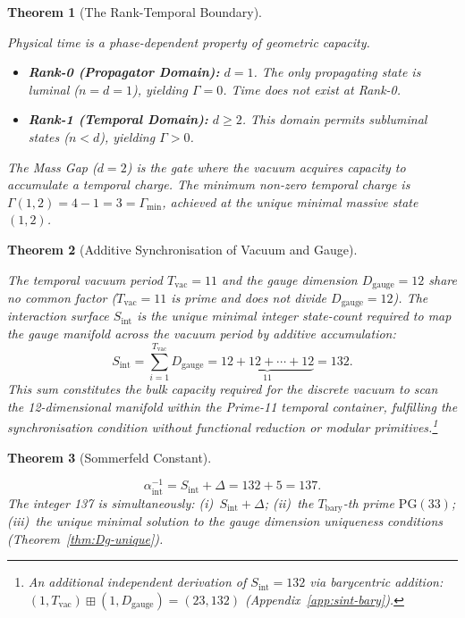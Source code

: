 \documentclass[11pt, letterpaper]{article}
\newcommand{\bplus}{\boxplus}
\newcommand{\Tcharge}{\Gamma}
\newcommand{\Dg}{D_{\mathrm{gauge}}}
\newcommand{\Sint}{S_{\mathrm{int}}}
\newcommand{\PG}{\mathrm{PG}}
\theoremstyle{definition}
\theoremstyle{plain}
\newtheorem{theorem}{Theorem}[section]
\begin{document}
\begin{theorem}[The Rank-Temporal Boundary]\label{thm:rank-temporal}
\begin{rsbox}
Physical time is a phase-dependent property of geometric capacity.
\begin{itemize}[nosep]
\item \textbf{Rank-0 (Propagator Domain):} $d=1$.  The only propagating state
  is luminal ($n=d=1$), yielding $\Tcharge=0$.  Time does not exist at Rank-0.
\item \textbf{Rank-1 (Temporal Domain):} $d\geq 2$.  This domain permits
  subluminal states ($n<d$), yielding $\Tcharge>0$.
\end{itemize}
The Mass Gap ($d=2$) is the gate where the vacuum acquires capacity
to accumulate a temporal charge.  The minimum non-zero temporal charge is
$\Tcharge(1,2)=4-1=3=\Gamma_{\min}$, achieved at the unique minimal massive
state $(1,2)$.
\end{rsbox}
\end{theorem}

\begin{theorem}[Additive Synchronisation of Vacuum and Gauge]
\label{thm:sint-additive}
\begin{rsbox}
The temporal vacuum period $T_{\mathrm{vac}}=11$ and the gauge dimension
$\Dg=12$ share no common factor ($T_{\mathrm{vac}}=11$ is prime and does not divide $\Dg=12$).  The interaction
surface $\Sint$ is the unique minimal integer state-count required to map the
gauge manifold across the vacuum period by additive accumulation:
\begin{equation}\label{eq:sint}
\Sint = \sum_{i=1}^{T_{\mathrm{vac}}}\Dg
= \underbrace{12+12+\cdots+12}_{11}=132.
\end{equation}
This sum constitutes the bulk capacity required for the discrete vacuum to
scan the 12-dimensional manifold within the Prime-11 temporal container,
fulfilling the synchronisation condition without functional reduction or
modular primitives.\footnote{An additional independent derivation of
$\Sint=132$ via barycentric addition: $(1,T_{\mathrm{vac}})\bplus(1,\Dg)=(23,132)$
(Appendix~\ref{app:sint-bary}).}
\end{rsbox}
\end{theorem}

\begin{theorem}[Sommerfeld Constant]\label{thm:alpha-int}
\begin{rsbox}
\[
\alpha^{-1}_{\mathrm{int}}=\Sint+\Delta=132+5=137.
\]
The integer 137 is simultaneously: (i)~$\Sint+\Delta$; (ii)~the
$T_{\mathrm{bary}}$-th prime $\PG(33)$; (iii)~the unique minimal solution to
the gauge dimension uniqueness conditions (Theorem~\ref{thm:Dg-unique}).
\end{rsbox}
\end{theorem}
\end{document}
